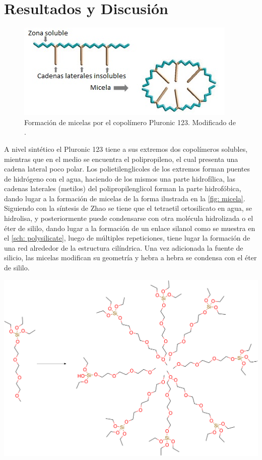 \documentclass[fleqn,11pt]{SelfArx}
\begin{document}
	\section{Resultados y Discusi\'on}
	\begin{figure}[h]
		\centering
		\includegraphics[width=0.8\linewidth]{structures/Micela.jpg}
		\caption{Formaci\'on de micelas por el copol\'imero Pluronic 123. Modificado de \cite{grallert_rangel_yagui_pasqualoto_tavares_2012}.}
		\label{fig: micela}
	\end{figure}
	A nivel sint\'etico el Pluronic 123 tiene a sus extremos dos copol\'imeros solubles, mientras que en el medio se encuentra el polipropileno, el cual presenta una cadena lateral poco polar. Los polietilenglicoles de los extremos forman puentes de hidr\'ogeno con el agua, haciendo de los mismos una parte hidrof\'ilica, las cadenas laterales (metilos) del polipropilenglicol forman la parte hidrof\'obica, dando lugar a la formaci\'on de micelas de la forma ilustrada en la \autoref{fig: micela}. Siguiendo con la s\'intesis de Zhao se tiene que el tetraetil ortosilicato en agua, se hidrolisa, y posteriormente puede condensarse con otra mol\'ecula hidrolizada o el \'eter de sililo, dando lugar a la formaci\'on de un enlace silanol como se muestra en el \autoref{sch: polysilicate}, luego de m\'ultiples repeticiones, tiene lugar la formaci\'on de una red alrededor de la estructura cil\'indrica. Una vez adicionada la fuente de silicio, las micelas modifican su geometr\'ia y hebra a hebra se condensa con el \'eter de sililo.
	\begin{scheme}[h]
		\centering
		\includegraphics[width=\linewidth]{structures/micelaSi.png}
		\caption{Formaci\'on de las micelas con la incorporaci\'on del silicio \cite{yang_2011}.}
		\label{sch: micelaSi1}
	\end{scheme}
	
\end{document}
